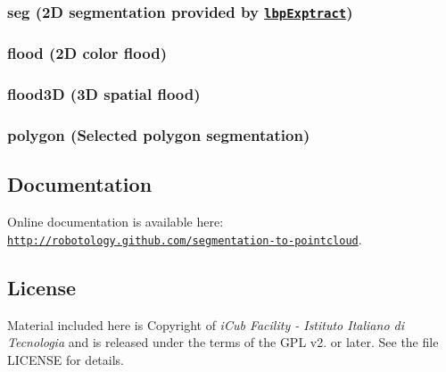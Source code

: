 \subsubsection*{seg (2D segmentation provided by \href{https://github.com/robotology/segmentation/tree/master/lbpExtract}{\tt lbp\+Exptract})}



\subsubsection*{flood (2D color flood)}



\subsubsection*{flood3D (3D spatial flood)}



\subsubsection*{polygon (Selected polygon segmentation)}



\subsection*{Documentation}

Online documentation is available here\+: \href{http://robotology.github.com/segmentation-to-pointcloud}{\tt http\+://robotology.\+github.\+com/segmentation-\/to-\/pointcloud}.

\subsection*{License}

Material included here is Copyright of {\itshape i\+Cub Facility -\/ Istituto Italiano di Tecnologia} and is released under the terms of the G\+PL v2. or later. See the file L\+I\+C\+E\+N\+SE for details. 